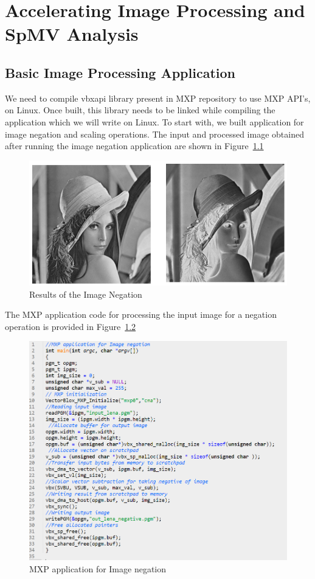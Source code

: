 \newpage
\chapter{Accelerating Image Processing and SpMV Analysis}

\section{Basic Image Processing Application}

We need to compile vbxapi library present in MXP repository to use MXP API’s, on Linux. Once built, this library needs to be linked while compiling the application which we will write on Linux. To start with, we built application for image negation and scaling operations. The input and processed image obtained after running the image negation application are shown in Figure~\ref{lena:7}

\begin{figure}
	\centering
	\includegraphics[width=.9\textwidth]{images/lena.png}
	\caption{Results of the Image Negation}
	\label{lena:7}
\end{figure}

The MXP application code for processing the input image for a negation operation is provided in Figure~\ref{cod:7}

\begin{figure}
	\centering
	\includegraphics[width=1\textwidth]{images/code2.png}
	\caption{MXP application for Image negation}
	\label{cod:7}
\end{figure}

